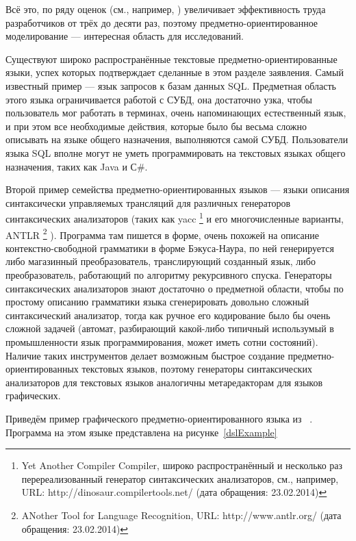 Всё это, по ряду оценок (см., например, \cite{kieburtz1996software, kelly2000visual, gray2003examination})
увеличивает эффективность труда разработчиков от трёх до десяти раз, поэтому 
предметно-ориентированное моделирование --- интересная область для исследований.

Существуют широко распространённые текстовые предметно-ориентированные языки, 
успех которых подтверждает сделанные в этом разделе заявления. Самый известный 
пример --- язык запросов к базам данных SQL. Предметная область этого языка 
ограничивается работой с СУБД, она достаточно узка, чтобы пользователь мог 
работать в терминах, очень напоминающих естественный язык, и при этом все 
необходимые действия, которые было бы весьма сложно описывать на языке общего 
назначения, выполняются самой СУБД. Пользователи языка SQL вполне могут не уметь 
программировать на текстовых языках общего назначения, таких как Java и С\#. 

Второй пример семейства предметно-ориентированных языков --- языки описания 
синтаксически управляемых трансляций для различных генераторов синтаксических 
анализаторов (таких как yacc
\footnote{Yet Another Compiler Compiler, широко распространённый и несколько раз перереализованный генератор 
синтаксических анализаторов, см., например, URL: http://dinosaur.compilertools.net/ (дата обращения: 23.02.2014)}
 и его многочисленные варианты, ANTLR
\footnote{ANother Tool for Language Recognition, URL: http://www.antlr.org/ (дата обращения: 23.02.2014)}
). Программа там пишется в форме, очень похожей на описание контекстно-свободной 
грамматики в форме Бэкуса-Наура, по ней генерируется либо магазинный 
преобразователь, транслирующий созданный язык, либо преобразователь, работающий 
по алгоритму рекурсивного спуска. Генераторы синтаксических анализаторов знают 
достаточно о предметной области, чтобы по простому описанию грамматики языка 
сгенерировать довольно сложный синтаксический анализатор, тогда как ручное его 
кодирование было бы очень сложной задачей (автомат, разбирающий какой-либо 
типичный использумый в промышленности язык программирования, может иметь сотни 
состояний). Наличие таких инструментов делает возможным быстрое создание 
предметно-ориентированных текстовых языков, поэтому генераторы синтаксических 
анализаторов для текстовых языков аналогичны метаредакторам для языков 
графических.

Приведём пример графического предметно-ориентированного языка из~\cite{kelly2008domain}
. Программа на этом языке представлена на рисунке~\ref{dslExample}

